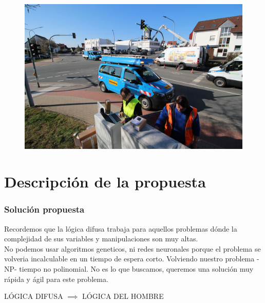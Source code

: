 \documentclass[
	11pt, %
]{beamer}
\begin{document}
\begin{frame}
  
  \begin{figure}
    \includegraphics[width=0.8\linewidth]{street_code.jpeg}
  \end{figure}
  
    
\end{frame}

\section{Descripción de la propuesta}
\begin{frame}
  \frametitle{Solución propuesta}
  
  Recordemos que la lógica difusa trabaja para aquellos problemas dónde la complejidad de sus variables y manipulaciones son muy altas. \\

  No podemos usar algoritmos geneticos, ni redes neuronales porque el problema se volveria incalculable en un tiempo de espera corto. Volviendo nuestro problema -NP- tiempo no polinomial. No es lo que buscamos, queremos una solución muy rápida y ágil para este problema.\\
  \bigskip %
  \begin{center}
    LÓGICA DIFUSA $\implies$ LÓGICA DEL HOMBRE
  \end{center}
      
\end{frame}
\end{document}

